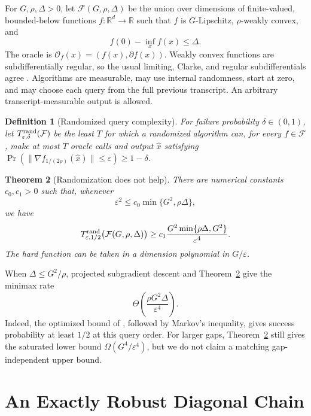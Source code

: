 \documentclass[twoside]{article}
\newtheorem{theorem}{Theorem}
\newtheorem{definition}[theorem]{Definition}
\newcommand{\R}{\mathbb R}
\newcommand{\cF}{\mathcal F}
\newcommand{\cO}{\mathcal O}
\newcommand{\ve}{\varepsilon}
\begin{document}
For $G,\rho,\Delta>0$, let $\cF(G,\rho,\Delta)$ be the union over dimensions of finite-valued, bounded-below functions $f:\R^d\to\R$ such that $f$ is $G$-Lipschitz, $\rho$-weakly convex, and \[ f(0)-\inf_x f(x)\leq\Delta. \] The oracle is $\cO_f(x)=(f(x),\partial f(x))$. Weakly convex functions are subdifferentially regular, so the usual limiting, Clarke, and regular subdifferentials agree \citep{rockafellar2009variational}. Algorithms are measurable, may use internal randomness, start at zero, and may choose each query from the full previous transcript. An arbitrary transcript-measurable output is allowed.

\begin{definition}[Randomized query complexity]
For failure probability $\delta\in(0,1)$, let $T_{\ve,\delta}^{\rm rand}(\cF)$ be the least $T$ for which a randomized algorithm can, for every $f\in\cF$, make at most $T$ oracle calls and output $\widehat x$ satisfying $\Pr(\|\nabla f_{1/(2\rho)}(\widehat x)\|\leq\ve)\geq1-\delta$.
\end{definition}

\begin{theorem}[Randomization does not help]
\label{thm:main}
There are numerical constants $c_0,c_1>0$ such that, whenever \[ \ve^2\leq c_0\min\{G^2,\rho\Delta\}, \] we have \[ T_{\ve,1/2}^{\rm rand}\bigl(\cF(G,\rho,\Delta)\bigr) \geq c_1 \frac{G^2\min\{\rho\Delta,G^2\}}{\ve^4}. \] The hard function can be taken in a dimension polynomial in $G/\ve$.
\end{theorem}

When $\Delta\leq G^2/\rho$, projected subgradient descent \citep{davis2018stochastic} and Theorem~\ref{thm:main} give the minimax rate
\begin{equation}
 \Theta\!\left(
 \frac{\rho G^2\Delta}{\ve^4}
 \right).
 \label{eq:minimax-rate}
\end{equation}
Indeed, the optimized bound of \citet[Corollary~2.2]{davis2018stochastic}, followed by Markov's inequality, gives success probability at least $1/2$ at this query order. For larger gaps, Theorem~\ref{thm:main} still gives the saturated lower bound $\Omega(G^4/\ve^4)$, but we do not claim a matching gap-independent upper bound.

\section{An Exactly Robust Diagonal Chain}
\label{sec:chain}
\end{document}
